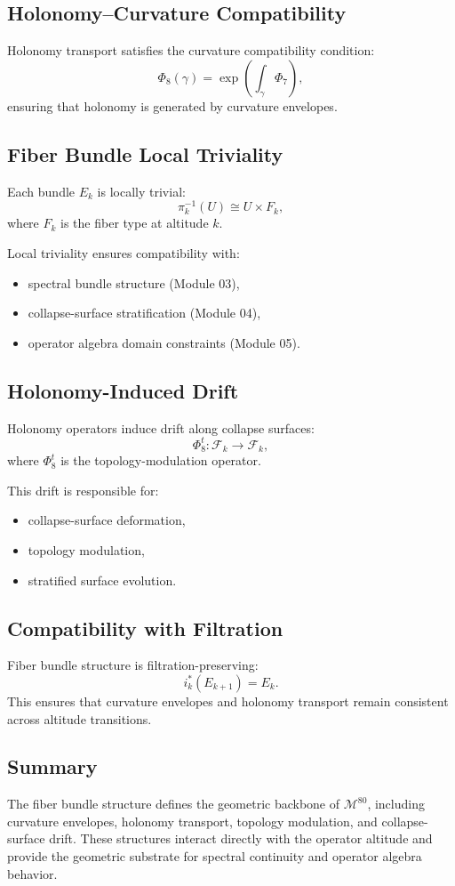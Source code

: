\subsection{Holonomy–Curvature Compatibility}
Holonomy transport satisfies the curvature compatibility condition:
\[
\Phi_8(\gamma) = \exp\left( \int_\gamma \Phi_7 \right),
\]
ensuring that holonomy is generated by curvature envelopes.

\subsection{Fiber Bundle Local Triviality}
Each bundle $E_k$ is locally trivial:
\[
\pi_k^{-1}(U) \cong U \times F_k,
\]
where $F_k$ is the fiber type at altitude $k$.

Local triviality ensures compatibility with:
\begin{itemize}
    \item spectral bundle structure (Module 03),
    \item collapse-surface stratification (Module 04),
    \item operator algebra domain constraints (Module 05).
\end{itemize}

\subsection{Holonomy-Induced Drift}
Holonomy operators induce drift along collapse surfaces:
\[
\Phi_8^t : \mathcal{F}_k \to \mathcal{F}_k,
\]
where $\Phi_8^t$ is the topology-modulation operator.

This drift is responsible for:
\begin{itemize}
    \item collapse-surface deformation,
    \item topology modulation,
    \item stratified surface evolution.
\end{itemize}

\subsection{Compatibility with Filtration}
Fiber bundle structure is filtration-preserving:
\[
i_k^\ast(E_{k+1}) = E_k.
\]
This ensures that curvature envelopes and holonomy transport remain consistent
across altitude transitions.

\subsection{Summary}
The fiber bundle structure defines the geometric backbone of $\mathcal{M}^{80}$,
including curvature envelopes, holonomy transport, topology modulation, and
collapse-surface drift. These structures interact directly with the operator
altitude and provide the geometric substrate for spectral continuity and
operator algebra behavior.

